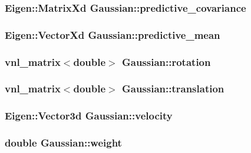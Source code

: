 \hypertarget{class_gaussian_afadc9984777174ca00506af635c9db1a}{
\subsubsection[{predictive\-\_\-covariance}]{\setlength{\rightskip}{0pt plus 5cm}\-Eigen\-::\-Matrix\-Xd {\bf \-Gaussian\-::predictive\-\_\-covariance}}}\label{class_gaussian_afadc9984777174ca00506af635c9db1a}
\hypertarget{class_gaussian_af57af53a8c6d0006cc8a6a7658198eb0}{
\subsubsection[{predictive\-\_\-mean}]{\setlength{\rightskip}{0pt plus 5cm}\-Eigen\-::\-Vector\-Xd {\bf \-Gaussian\-::predictive\-\_\-mean}}}\label{class_gaussian_af57af53a8c6d0006cc8a6a7658198eb0}
\hypertarget{class_gaussian_a859907145de3080604d20cc1105cd1e5}{
\subsubsection[{rotation}]{\setlength{\rightskip}{0pt plus 5cm}vnl\-\_\-matrix$<$double$>$ {\bf \-Gaussian\-::rotation}}}\label{class_gaussian_a859907145de3080604d20cc1105cd1e5}
\hypertarget{class_gaussian_a2469316effaaf6d03566d534fefa64fc}{
\subsubsection[{translation}]{\setlength{\rightskip}{0pt plus 5cm}vnl\-\_\-matrix$<$double$>$ {\bf \-Gaussian\-::translation}}}\label{class_gaussian_a2469316effaaf6d03566d534fefa64fc}
\hypertarget{class_gaussian_a09ad4d04a27b2e6be4945719da025927}{
\subsubsection[{velocity}]{\setlength{\rightskip}{0pt plus 5cm}\-Eigen\-::\-Vector3d {\bf \-Gaussian\-::velocity}}}\label{class_gaussian_a09ad4d04a27b2e6be4945719da025927}
\hypertarget{class_gaussian_ae6192dadf70b84fa41dcf4498b5aaf52}{
\subsubsection[{weight}]{\setlength{\rightskip}{0pt plus 5cm}double {\bf \-Gaussian\-::weight}}}\label{class_gaussian_ae6192dadf70b84fa41dcf4498b5aaf52}



